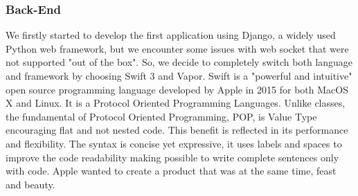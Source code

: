\documentclass[]{usiinfbachelorproject}
\begin{document}
%

\subsubsection{Back-End}
We firstly started to develop the first application using Django, a widely used Python web framework, but we encounter some issues with web socket that were not supported "out of the box".
So, we decide to completely switch both language and framework by choosing Swift 3 and Vapor.
Swift is a "powerful and intuitive" open source programming language developed by Apple in 2015 for both MacOS X and Linux. It is a Protocol Oriented Programming Languages.
Unlike classes, the fundamental of Protocol Oriented Programming, POP, is Value Type encouraging flat and not nested code. This benefit is reflected in its performance and flexibility.
The syntax is concise yet expressive, it uses labels and spaces to improve the code readability making possible to write complete sentences only with code. Apple wanted to create a product that was at the same time, feast and beauty.
\end{document}
